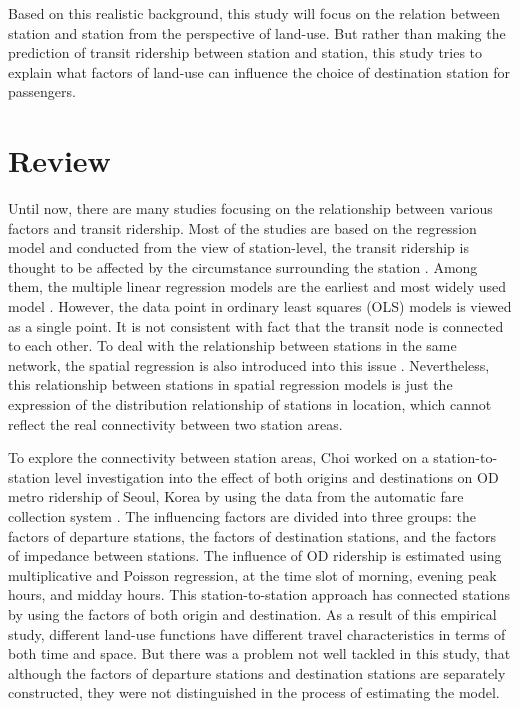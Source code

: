 Based on this realistic background, this study will focus on the relation between station and station from the perspective of land-use. But rather than making the prediction of transit ridership between station and station, this study tries to explain what factors of land-use can influence the choice of destination station for passengers. 

\section{Review}
%
Until now, there are many studies focusing on the relationship between various factors and transit ridership. Most of the studies are based on the regression model and conducted from the view of station-level, the transit ridership is thought to be affected by the circumstance surrounding the station \cite{cervero1997travel,taylor2003analyzing,zhao2005transit,estupinan2008relationship,taylor2009nature,sohn2010factors,gutierrez2011transit,jun2015land}. Among them, the multiple linear regression models are the earliest and most widely used model \cite{cervero1997travel,gutierrez2011transit}. However, the data point in ordinary least squares (OLS) models is viewed as a single point. It is not consistent with fact that the transit node is connected to each other. To deal with the relationship between stations in the same network, the spatial regression is also introduced into this issue \cite{cardozo2012application,jun2015land}. Nevertheless, this relationship between stations in spatial regression models is just the expression of the distribution relationship of stations in location, which cannot reflect the real connectivity between two station areas.

%
To explore the connectivity between station areas, Choi worked on a station-to-station level investigation into the effect of both origins and destinations on OD metro ridership of Seoul, Korea by using the data from the automatic fare collection system \cite{choi2012analysis}. The influencing factors are divided into three groups: the factors of departure stations, the factors of destination stations, and the factors of impedance between stations. The influence of OD ridership is estimated using multiplicative and Poisson regression, at the time slot of morning, evening peak hours, and midday hours. This station-to-station approach has connected stations by using the factors of both origin and destination. As a result of this empirical study, different land-use functions have different travel characteristics in terms of both time and space. But there was a problem not well tackled in this study, that although the factors of departure stations and destination stations are separately constructed, they were not distinguished in the process of estimating the model. 

